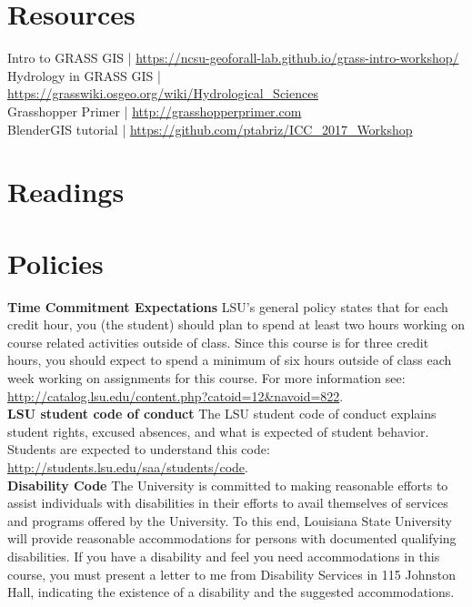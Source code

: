 \documentclass[11pt,article,oneside]{memoir}
\begin{document}
\section{Resources}
Intro to GRASS GIS | \url{https://ncsu-geoforall-lab.github.io/grass-intro-workshop/}\\
Hydrology in GRASS GIS | \url{https://grasswiki.osgeo.org/wiki/Hydrological_Sciences}\\
Grasshopper Primer | \url{http://grasshopperprimer.com}\\
BlenderGIS tutorial | \url{https://github.com/ptabriz/ICC_2017_Workshop}

\clearpage
\section{Readings}
\renewcommand*{\bibfont}{\normalsize} %
\vspace*{0.5cm}
\nocite{*}
\setlength{}
\printbibliography[heading=none]

\clearpage

\section{Policies}

\noindent \textbf{Time Commitment Expectations}
LSU's general policy states that for each credit hour, you (the student) should plan to
spend at least two hours working on course related activities outside of class. Since this course is for three credit hours, you should expect to spend a minimum of six hours outside of class each week working on assignments for this course. For more information see: 
\url{http://catalog.lsu.edu/content.php?catoid=12&navoid=822}.\\

\noindent \textbf{LSU student code of conduct}
The LSU student code of conduct explains student rights, excused absences, and what is expected of student behavior. Students are expected to understand this code:  \url{http://students.lsu.edu/saa/students/code}.\\ %

\noindent \textbf{Disability Code}
The University is committed to making reasonable efforts to assist individuals with disabilities in
their efforts to avail themselves of services and programs offered by the University. To this end,
Louisiana State University will provide reasonable accommodations for persons with
documented qualifying disabilities. If you have a disability and feel you need accommodations in
this course, you must present a letter to me from Disability Services in 115 Johnston Hall,
indicating the existence of a disability and the suggested accommodations.\\
\end{document}
